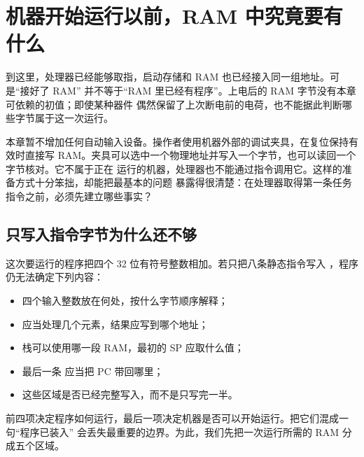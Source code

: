 \section{机器开始运行以前，RAM 中究竟要有什么}

到这里，处理器已经能够取指，启动存储和 RAM 也已经接入同一组地址。可是“接好了 RAM”
并不等于“RAM 里已经有程序”。上电后的 RAM 字节没有本章可依赖的初值；即使某种器件
偶然保留了上次断电前的电荷，也不能据此判断哪些字节属于这一次运行。

本章暂不增加任何自动输入设备。操作者使用机器外部的调试夹具，在复位保持有效时直接写
RAM。夹具可以选中一个物理地址并写入一个字节，也可以读回一个字节核对。它不属于正在
运行的机器，处理器也不能通过指令调用它。这样的准备方式十分笨拙，却能把最基本的问题
暴露得很清楚：在处理器取得第一条任务指令之前，必须先建立哪些事实？

\subsection{只写入指令字节为什么还不够}

这次要运行的程序把四个 32 位有符号整数相加。若只把八条静态指令写入
，程序仍无法确定下列内容：

\begin{itemize}
\item 四个输入整数放在何处，按什么字节顺序解释；
\item 应当处理几个元素，结果应写到哪个地址；
\item 栈可以使用哪一段 RAM，最初的 SP 应取什么值；
\item 最后一条  应当把 PC 带回哪里；
\item 这些区域是否已经完整写入，而不是只写完一半。
\end{itemize}

前四项决定程序如何运行，最后一项决定机器是否可以开始运行。把它们混成一句“程序已装入”
会丢失最重要的边界。为此，我们先把一次运行所需的 RAM 分成五个区域。

